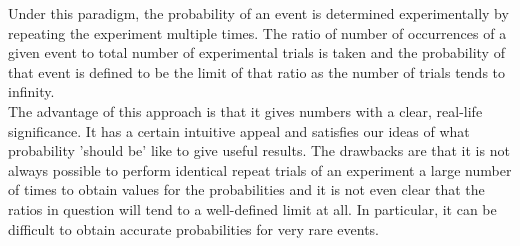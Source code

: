 \documentclass[12pt,a4paper]{article}
\begin{document}
\vspace{12pt}
\par
\vspace{12pt}

Under this paradigm, the probability of an event is determined experimentally by repeating the experiment multiple times. The ratio of number of occurrences of a given event to total number of experimental trials is taken and the probability of that event is defined to be the limit of that ratio as the number of trials tends to infinity.\\
\indent The advantage of this approach is that it gives numbers with a clear, real-life significance. It has a certain intuitive appeal and satisfies our ideas of what probability 'should be' like to give useful results. The drawbacks are that it is not always possible to perform identical repeat trials of an experiment a large number of times to obtain values for the probabilities and it is not even clear that the ratios in question will tend to a well-defined limit at all. In particular, it can be difficult to obtain accurate probabilities for very rare events.\par
\vspace{12pt}

\par
\vspace{12pt}
\end{document}
